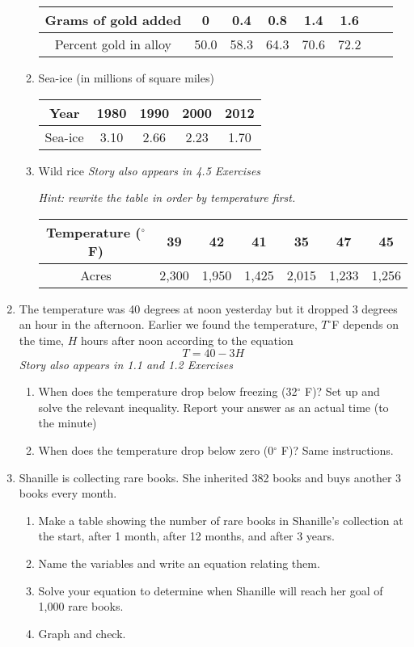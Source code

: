 \begin{enumerate}
\begin{enumerate}
\begin{tabular} {|c| |c |c  |c |c |c |c |c|}\hline
Grams of gold added & 0 & 0.4 & 0.8  & 1.4 & 1.6  \\ \hline
Percent gold in alloy &50.0 & 58.3& 64.3 & 70.6&72.2 \\ \hline
\end{tabular} \bigskip

\item Sea-ice (in millions of square miles) %

\begin{tabular} {|c| |c |c  |c |c |}\hline
Year & 1980 & 1990 & 2000 & 2012 \\ \hline
Sea-ice & 3.10 & 2.66 & 2.23 & 1.70 \\ \hline
\end{tabular} \bigskip

\item Wild rice \hfill \emph{Story also appears in 4.5 Exercises}

\emph{Hint:  rewrite the table in order by temperature first.}

\begin{tabular} {|c|| c|c |c|c|c|c|}  \hline
Temperature ($^\circ$F) & 39 & 42 & 41 & 35 & 47 & 45 
 \\ \hline
Acres & 2,300 & 1,950 & 1,425 & 2,015 & 1,233 & 1,256  \\ \hline
\end{tabular} \bigskip

\end{enumerate} 

\item  The temperature was 40 degrees at noon yesterday but it dropped 3 degrees an hour in the afternoon.  Earlier we found the temperature, $T^\circ$F depends on the time, $H$ hours after noon according to the equation 
$$T=40-3H$$
\hfill \emph{Story also appears in 1.1 and 1.2 Exercises}
\begin{enumerate}
 \item When does the temperature drop below freezing (32$^{\circ}$ F)?  Set up and solve the relevant inequality.  Report your answer as an actual time (to the minute) 
 \item When does the temperature drop below zero (0$^{\circ}$ F)? Same instructions. 
 \end{enumerate} 

\item Shanille is collecting rare books.  She inherited 382 books and buys another 3 books every month.
\begin{enumerate}
\item Make a table showing the number of rare books in Shanille's collection at the start, after 1 month, after 12 months, and after 3 years.
\item Name the variables and write an equation relating them.
\item Solve your equation to determine when Shanille will reach her goal of 1,000 rare books.
\item Graph and check.  
\end{enumerate}

\end{enumerate}

